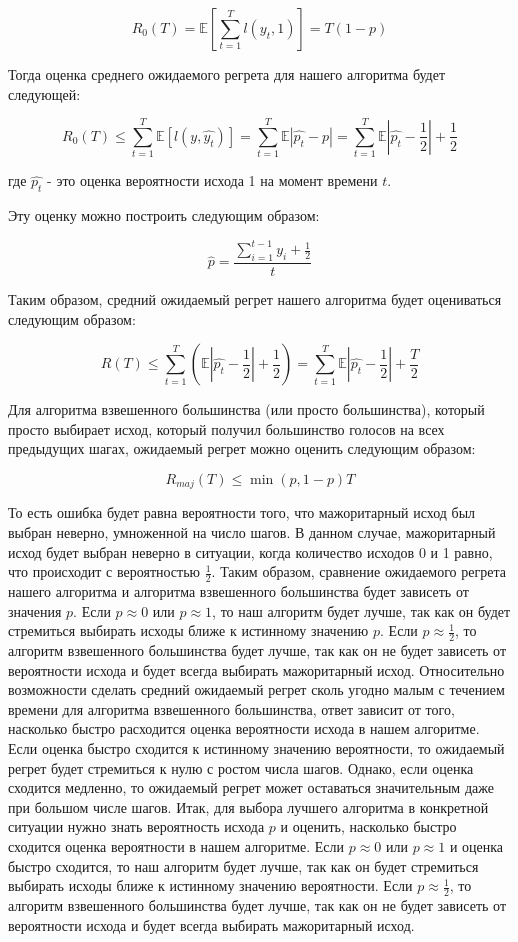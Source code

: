 \documentclass[a4paper,14pt]{extarticle}
\begin{document}
$$R_0(T) = \mathbb{E}\left[\sum_{t=1}^{T} l\left(y_t, 1\right)\right] = T(1 - p)$$

Тогда оценка среднего ожидаемого регрета для нашего алгоритма будет следующей:

$$R_0(T) \le \sum_{t=1}^{T}\mathbb{E}\left[l\left(y, \hat{y_t}\right)\right] = \sum_{t=1}^{T}\mathbb{E}\left|\hat{p_t} - p\right| = \sum_{t=1}^{T}\mathbb{E}\left|\hat{p_t} - \frac{1}{2}\right| + \frac{1}{2}$$

где $\hat{p_t}$ - это оценка вероятности исхода 1 на момент времени $t$.

Эту оценку можно построить следующим образом:

$$\hat{p} = \frac{\sum_{i = 1}^{t - 1} y_i + \frac{1}{2}}{t}$$

Таким образом, средний ожидаемый регрет нашего алгоритма будет оцениваться следующим образом:

$$R(T) \leq \sum_{t=1}^T \left(\mathbb{E}\left|\hat{p_t}-\frac{1}{2}\right| + \frac{1}{2}\right) = \sum_{t=1}^T \mathbb{E}\left|\hat{p_t}-\frac{1}{2}\right| + \frac{T}{2}$$

Для алгоритма взвешенного большинства (или просто большинства), который просто выбирает исход, который получил большинство голосов на всех предыдущих шагах, ожидаемый регрет можно оценить следующим образом:

$$R_{maj}(T) \leq \min(p, 1-p)T$$

То есть ошибка будет равна вероятности того, что мажоритарный исход был выбран неверно, умноженной на число шагов. В данном случае, мажоритарный исход будет выбран неверно в ситуации, когда количество исходов 0 и 1 равно, что происходит с вероятностью $\frac{1}{2}$. Таким образом, сравнение ожидаемого регрета нашего алгоритма и алгоритма взвешенного большинства будет зависеть от значения $p$. Если $p\approx 0$ или $p\approx 1$, то наш алгоритм будет лучше, так как он будет стремиться выбирать исходы ближе к истинному значению $p$. Если $p\approx \frac{1}{2}$, то алгоритм взвешенного большинства будет лучше, так как он не будет зависеть от вероятности исхода и будет всегда выбирать мажоритарный исход.
Относительно возможности сделать средний ожидаемый регрет сколь угодно малым с течением времени для алгоритма взвешенного большинства, ответ зависит от того, насколько быстро расходится оценка вероятности исхода в нашем алгоритме. Если оценка быстро сходится к истинному значению вероятности, то ожидаемый регрет будет стремиться к нулю с ростом числа шагов. Однако, если оценка сходится медленно, то ожидаемый регрет может оставаться значительным даже при большом числе шагов.
Итак, для выбора лучшего алгоритма в конкретной ситуации нужно знать вероятность исхода $p$ и оценить, насколько быстро сходится оценка вероятности в нашем алгоритме. Если $p\approx 0$ или $p\approx 1$ и оценка быстро сходится, то наш алгоритм будет лучше, так как он будет стремиться выбирать исходы ближе к истинному значению вероятности. Если $p\approx \frac{1}{2}$, то алгоритм взвешенного большинства будет лучше, так как он не будет зависеть от вероятности исхода и будет всегда выбирать мажоритарный исход.
\end{document}
